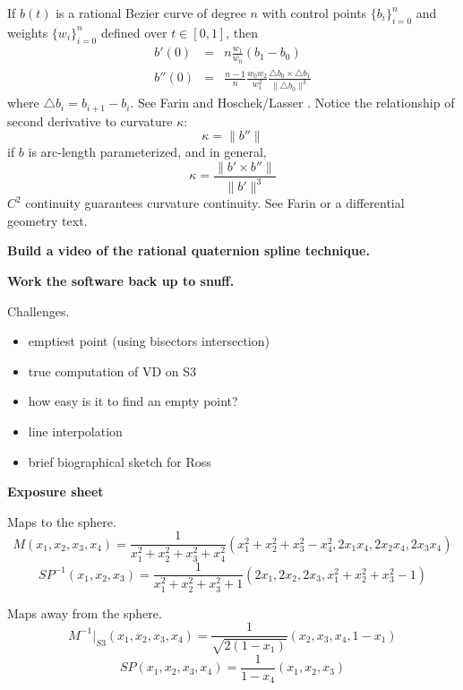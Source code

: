 \documentclass[12pt]{article}
\begin{document}
If $b(t)$ is a rational Bezier curve of degree $n$ 
with control points $\{b_i\}_{i=0}^n$ and 
weights $\{w_i\}_{i=0}^n$ defined over $t \in [0,1]$, then 
\begin{eqnarray}
\label{eqn:firstderiv}
b'(0) & = & n \frac{w_1}{w_0} (b_1 - b_0) \\
\label{eqn:secondderiv}
b''(0) & = & \frac{n-1}{n} \frac{w_0 w_2}{w_1^2} 
             \frac{\triangle b_0 \times \triangle b_1}{\| \triangle b_0\|^3}
\end{eqnarray}
where $\triangle b_i = b_{i+1} - b_i$.
See Farin \cite{farin02} and Hoschek/Lasser \cite{hoschekLasser0?}. 
Notice the relationship of second derivative to curvature $\kappa$:
\[
    \kappa = \|b''\|
\]
if $b$ is arc-length parameterized, and in general,
\[
    \kappa = \frac{\| b' \times b'' \|}{\| b' \|^3}
\]
$C^2$ continuity guarantees curvature continuity.
See Farin \cite{farin02} or a differential geometry text.

\clearpage

{\bf Build a video of the rational quaternion spline technique.}

{\bf Work the software back up to snuff.}

Challenges.
\begin{itemize}
\item emptiest point (using bisectors intersection)
\item true computation of VD on S3
\item how easy is it to find an empty point?
\item line interpolation
\item brief biographical sketch for Ross
\end{itemize}

{\bf Exposure sheet}

Maps to the sphere.
\[
	M(x_1,x_2,x_3,x_4) =
	\frac{1}{x_1^2 + x_2^2 + x_3^2 + x_4^2}
	(x_1^2 + x_2^2 + x_3^2 - x_4^2, 2x_1x_4, 2x_2x_4, 2x_3x_4)
\]
\[
SP^{-1}(x_1,x_2,x_3) = \frac{1}{x_1^2 + x_2^2 + x_3^2 + 1} 
                       (2x_1, 2x_2, 2x_3, x_1^2+x_2^2+x_3^2 - 1)
\]

Maps away from the sphere.
\[
M^{-1}|_{S3}(x_1,x_2,x_3,x_4) = \frac{1}{\sqrt{2(1-x_1)}}(x_2,x_3,x_4,1-x_1)
\]
\[
SP(x_1,x_2,x_3,x_4) = \frac{1}{1-x_4} (x_1,x_2,x_3)
\]
\end{document}
